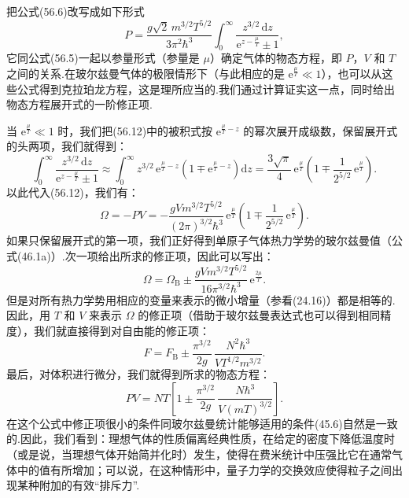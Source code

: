 把公式(56.6)改写成如下形式
\begin{equation}
  P=\frac{g\sqrt{2}\,m^{3/2}T^{5/2}}{3\pi^2\hbar^3}
  \int_0^{\infty}\frac{z^{3/2}\,\mathrm{d}z}{\mathrm{e}^{z-\frac{\mu}{T}}\pm1},
\end{equation}
它同公式(56.5)一起以参量形式（参量是 $\mu$）确定气体的物态方程，即 $P$，$V$ 和 $T$ 之间的关系.在玻尔兹曼气体的极限情形下（与此相应的是 $\mathrm{e}^{\frac{\mu}{T}}\ll1$），也可以从这些公式得到克拉珀龙方程，这是理所应当的.我们通过计算证实这一点，同时给出物态方程展开式的一阶修正项.

当 $\mathrm{e}^{\frac{\mu}{T}}\ll1$ 时，我们把(56.12)中的被积式按 $\mathrm{e}^{\frac{\mu}{T}-z}$ 的幂次展开成级数，保留展开式的头两项，我们就得到：
\begin{equation*}
  \int_0^{\infty}\frac{z^{3/2}\,\mathrm{d}z}{\mathrm{e}^{z-\frac{\mu}{T}}\pm1}
  \approx\int_0^{\infty}z^{3/2}\,\mathrm{e}^{\frac{\mu}{T}-z}
  \left(1\mp\mathrm{e}^{\frac{\mu}{T}-z}\right)\mathrm{d}z
  =\frac{3\sqrt{\pi}}{4}\,\mathrm{e}^{\frac{\mu}{T}}
  \left(1\mp\frac{1}{2^{5/2}}\,\mathrm{e}^{\frac{\mu}{T}}\right).
\end{equation*}
以此代入(56.12)，我们有：
\begin{equation*}
  \Omega=-PV=-\frac{gVm^{3/2}T^{5/2}}{(2\pi)^{3/2}\hbar^3}\,
  \mathrm{e}^{\frac{\mu}{T}}\left(1\mp\frac{1}{2^{5/2}}\,\mathrm{e}^{\frac{\mu}{T}}\right).
\end{equation*}
如果只保留展开式的第一项，我们正好得到单原子气体热力学势的玻尔兹曼值（公式(46.1a)）.次一项给出所求的修正项，因此可以写出：
\begin{equation}
  \Omega=\Omega_{\mathrm{B}}\pm\frac{gVm^{3/2}T^{5/2}}{16\pi^{3/2}\hbar^3}\,
  \mathrm{e}^{\frac{2\mu}{T}}.
\end{equation}
但是对所有热力学势用相应的变量来表示的微小增量（参看(24.16)）都是相等的.因此，用 $T$ 和 $V$ 来表示 $\Omega$ 的修正项（借助于玻尔兹曼表达式也可以得到相同精度），我们就直接得到对自由能的修正项：
\begin{equation}
  F=F_{\mathrm{B}}\pm\frac{\pi^{3/2}}{2g}\,\frac{N^2\hbar^3}{VT^{1/2}m^{3/2}}.
\end{equation}
最后，对体积进行微分，我们就得到所求的物态方程：
\begin{equation}
  PV=NT\left[1\pm\frac{\pi^{3/2}}{2g}\,
  \frac{N\hbar^3}{V(mT)^{3/2}}\right].
\end{equation}
在这个公式中修正项很小的条件同玻尔兹曼统计能够适用的条件(45.6)自然是一致的.因此，我们看到：理想气体的性质偏离经典性质，在给定的密度下降低温度时（或是说，当理想气体开始简并化时）发生，使得在费米统计中压强比它在通常气体中的值有所增加；可以说，在这种情形中，量子力学的交换效应使得粒子之间出现某种附加的有效“排斥力”.

